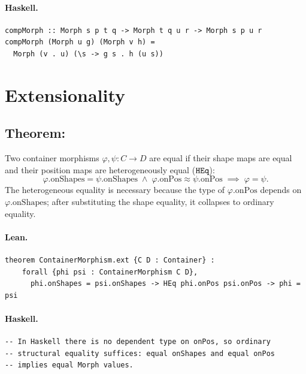 \documentclass[11pt,a4paper]{article}
\begin{document}
\paragraph{Haskell.}
\begin{lstlisting}[style=haskell]
compMorph :: Morph s p t q -> Morph t q u r -> Morph s p u r
compMorph (Morph u g) (Morph v h) =
  Morph (v . u) (\s -> g s . h (u s))
\end{lstlisting}


\section{Extensionality}

\subsection{Theorem: }

\begin{thm}
Two container morphisms $\varphi, \psi : C \to D$ are equal if their shape maps
are equal and their position maps are heterogeneously equal ($\texttt{HEq}$):
\[
  \varphi.\mathrm{onShapes} = \psi.\mathrm{onShapes}
  \;\wedge\;
  \varphi.\mathrm{onPos} \approx \psi.\mathrm{onPos}
  \;\implies\;
  \varphi = \psi.
\]
The heterogeneous equality is necessary because the type of
$\varphi.\mathrm{onPos}$ depends on $\varphi.\mathrm{onShapes}$; after
substituting the shape equality, it collapses to ordinary equality.
\end{thm}

\paragraph{Lean.}
\begin{lstlisting}[style=lean]
theorem ContainerMorphism.ext {C D : Container} :
    forall {phi psi : ContainerMorphism C D},
      phi.onShapes = psi.onShapes -> HEq phi.onPos psi.onPos -> phi = psi
\end{lstlisting}

\paragraph{Haskell.}
\begin{lstlisting}[style=haskell]
-- In Haskell there is no dependent type on onPos, so ordinary
-- structural equality suffices: equal onShapes and equal onPos
-- implies equal Morph values.
\end{lstlisting}
\end{document}
